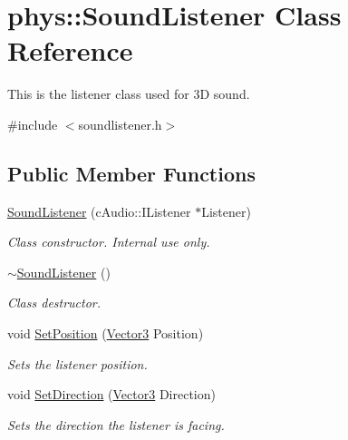 \hypertarget{classphys_1_1SoundListener}{
\section{phys::SoundListener Class Reference}
\label{d1/d5a/classphys_1_1SoundListener}
}


This is the listener class used for 3D sound.  




{\ttfamily \#include $<$soundlistener.h$>$}

\subsection*{Public Member Functions}
\begin{DoxyCompactItemize}
\item 
\hyperlink{classphys_1_1SoundListener_ab4063bdd8b0bc654a416915354ed0312}{SoundListener} (cAudio::IListener $\ast$Listener)
\begin{DoxyCompactList}\small\item\em Class constructor. Internal use only. \item\end{DoxyCompactList}\item 
\hyperlink{classphys_1_1SoundListener_ab32dd020228ca0e09271f988d3a2e7f9}{$\sim$SoundListener} ()
\begin{DoxyCompactList}\small\item\em Class destructor. \item\end{DoxyCompactList}\item 
void \hyperlink{classphys_1_1SoundListener_ab2a679aaf18c646365285c8691ffcb0c}{SetPosition} (\hyperlink{classphys_1_1Vector3}{Vector3} Position)
\begin{DoxyCompactList}\small\item\em Sets the listener position. \item\end{DoxyCompactList}\item 
void \hyperlink{classphys_1_1SoundListener_ad4ba93b650897e355c26b09e3f95bce0}{SetDirection} (\hyperlink{classphys_1_1Vector3}{Vector3} Direction)
\begin{DoxyCompactList}\small\item\em Sets the direction the listener is facing. \item\end{DoxyCompactList}\item 

\end{DoxyCompactItemize}
